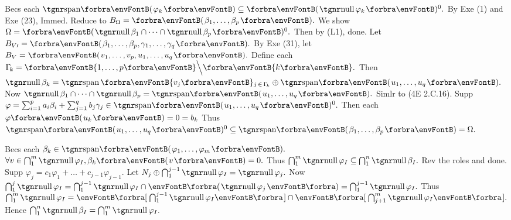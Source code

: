 Becs each $\Span{\varphi_k}\subseteq\Par{\null\varphi_k}{^0}.$ By {\NOTEFOR} Exe (1) and Exe (23), Immed.\PfEnd\parSol{\vspace{4pt}}
\Or Reduce to $B_{\Omega}=\Par{\beta_1,\dots,\beta_p}.$ We show $\Omega=\Par{\null\beta_1\cap\cdots\cap\null\beta_p}{^0}.$ Then by (L1), done.\parSol{}
Let $B_{V\apostrophe}=\Par{\beta_1,\dots,\beta_p,\gamma_1,\dots,\gamma_q}.$ By Exe (31), let $B_V=\Par{v_1,\dots,v_p,u_1,\dots,u_q}.$\parSol{}
Define each $\Gamma_{\!k}=\Bra{1,\dots,p}\Backslash[\Big]\Bra{k}.$ Then $\null\beta_k=\Spn\Bra{v_j}{_{j\,\in\,\Gamma_{\!k}}}\oplus\Span{u_1,\dots,u_q}.$\parSol{}
Now $\null\beta_1\cap\cdots\cap\null\beta_p=\Span{u_1,\dots,u_q}.$ Simlr to (4E 2.C.16).\parSol{}
Supp $\varphi=\sum_{i=1}^pa_i\beta_i+\sum_{j=1}^qb_j\gamma_j\in\Span{u_1,\dots,u_q}{^0}.$ Then each $\varphi\Par{u_k}=0=b_k$\parSol{}
Thus $\Span{u_1,\dots,u_q}{^0}\subseteq\Span{\beta_1,\dots,\beta_p}=\Omega.$\PfEnd
\SepLine

Becs each $\beta_k\in\Span{\varphi_1,\dots,\varphi_m}.$\parSol{}
$\forall v\in\bigcap_1^m\null\varphi_I,\beta_k\Par{v}=0.$ Thus $\bigcap_1^m\null\varphi_I\subseteq\bigcap_1^n\null\beta_I.$ \;Rev the roles and done.\PfEnd\vspace{2pt}
\ANote Supp $\varphi_j=c_1\varphi_1+\dots+c_{j-1}\varphi_{j-1}.$\parNot{\vspace{2pt}}
Let $N_j\oplus\bigcap_1^{j-1}\null\varphi_I=\null\varphi_j.$ Now $\bigcap_1^j\null\varphi_I=\bigcap_1^{j-1}\null\varphi_I\cap\BigPar{\null\varphi_j}=\bigcap_1^{j-1}\null\varphi_I.$\parNot{\vspace{2pt}}
Thus $\bigcap_1^m\null\varphi_I=\Sbra{\bigcap_1^{j-1}\null\varphi_I}\cap\Sbra{\bigcap_{j+1}^m\null\varphi_I}.$ \;Hence $\bigcap_1^n\null\beta_I=\bigcap_{1}^m\null\varphi_I.$
\SepLine

